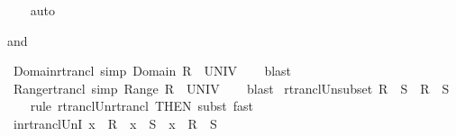 \begin{isabellebody}
%
\isadelimproof
\ \ %
\endisadelimproof
%
\isatagproof
{}\isamarkupfalse%
\ auto%
\endisatagproof
{\isafoldproof}%
%
\isadelimproof
%
\endisadelimproof
%
\begin{isamarkuptext}%
 and %
\end{isamarkuptext}\isamarkuptrue%
\isamarkupfalse%
\ Domain{\isacharunderscore}{\kern0pt}rtrancl\ {\isacharbrackleft}{\kern0pt}simp{\isacharbrackright}{\kern0pt}{\isacharcolon}{\kern0pt}\ {\isachardoublequoteopen}Domain\ {\isacharparenleft}{\kern0pt}R\isactrlsup {\isacharasterisk}{\kern0pt}{\isacharparenright}{\kern0pt}\ {\isacharequal}{\kern0pt}\ UNIV{\isachardoublequoteclose}\isanewline
%
\isadelimproof
\ \ %
\endisadelimproof
%
\isatagproof
{}\isamarkupfalse%
\ blast%
\endisatagproof
{\isafoldproof}%
%
\isadelimproof
\isanewline
%
\endisadelimproof
\isanewline
{}\isamarkupfalse%
\ Range{\isacharunderscore}{\kern0pt}rtrancl\ {\isacharbrackleft}{\kern0pt}simp{\isacharbrackright}{\kern0pt}{\isacharcolon}{\kern0pt}\ {\isachardoublequoteopen}Range\ {\isacharparenleft}{\kern0pt}R\isactrlsup {\isacharasterisk}{\kern0pt}{\isacharparenright}{\kern0pt}\ {\isacharequal}{\kern0pt}\ UNIV{\isachardoublequoteclose}\isanewline
%
\isadelimproof
\ \ %
\endisadelimproof
%
\isatagproof
{}\isamarkupfalse%
\ blast%
\endisatagproof
{\isafoldproof}%
%
\isadelimproof
\isanewline
%
\endisadelimproof
\isanewline
{}\isamarkupfalse%
\ rtrancl{\isacharunderscore}{\kern0pt}Un{\isacharunderscore}{\kern0pt}subset{\isacharcolon}{\kern0pt}\ {\isachardoublequoteopen}{\isacharparenleft}{\kern0pt}R\isactrlsup {\isacharasterisk}{\kern0pt}\ {\isasymunion}\ S\isactrlsup {\isacharasterisk}{\kern0pt}{\isacharparenright}{\kern0pt}\ {\isasymsubseteq}\ {\isacharparenleft}{\kern0pt}R\ {\isasymunion}\ S{\isacharparenright}{\kern0pt}\isactrlsup {\isacharasterisk}{\kern0pt}{\isachardoublequoteclose}\isanewline
%
\isadelimproof
\ \ %
\endisadelimproof
%
\isatagproof
{}\isamarkupfalse%
\ {\isacharparenleft}{\kern0pt}rule\ rtrancl{\isacharunderscore}{\kern0pt}Un{\isacharunderscore}{\kern0pt}rtrancl\ {\isacharbrackleft}{\kern0pt}THEN\ subst{\isacharbrackright}{\kern0pt}{\isacharparenright}{\kern0pt}\ fast%
\endisatagproof
{\isafoldproof}%
%
\isadelimproof
\isanewline
%
\endisadelimproof
\isanewline
{}\isamarkupfalse%
\ in{\isacharunderscore}{\kern0pt}rtrancl{\isacharunderscore}{\kern0pt}UnI{\isacharcolon}{\kern0pt}\ {\isachardoublequoteopen}x\ {\isasymin}\ R\isactrlsup {\isacharasterisk}{\kern0pt}\ {\isasymor}\ x\ {\isasymin}\ S\isactrlsup {\isacharasterisk}{\kern0pt}\ {\isasymLongrightarrow}\ x\ {\isasymin}\ {\isacharparenleft}{\kern0pt}R\ {\isasymunion}\ S{\isacharparenright}{\kern0pt}\isactrlsup {\isacharasterisk}{\kern0pt}{\isachardoublequoteclose}\isanewline

\end{isabellebody}
